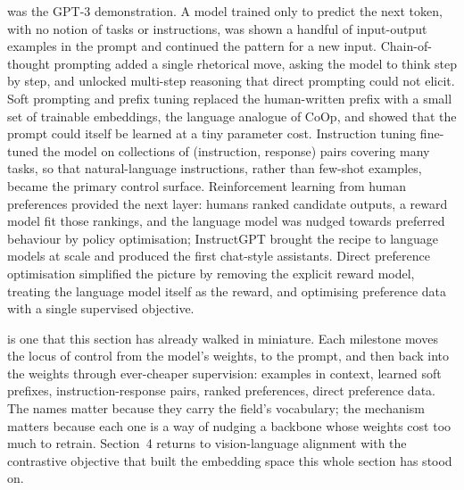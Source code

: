  was the GPT-3 demonstration\cite{Brown2020GPT3}. A model trained only to predict the next token, with no notion of tasks or instructions, was shown a handful of input-output examples in the prompt and continued the pattern for a new input. Chain-of-thought prompting\cite{Wei2022CoT} added a single rhetorical move, asking the model to think step by step, and unlocked multi-step reasoning that direct prompting could not elicit. Soft prompting and prefix tuning\cite{Lester2021PromptTuning,Li2021PrefixTuning} replaced the human-written prefix with a small set of trainable embeddings, the language analogue of CoOp, and showed that the prompt could itself be learned at a tiny parameter cost. Instruction tuning\cite{Wei2021FLAN,Sanh2021T0} fine-tuned the model on collections of (instruction, response) pairs covering many tasks, so that natural-language instructions, rather than few-shot examples, became the primary control surface. Reinforcement learning from human preferences\cite{Christiano2017Preferences} provided the next layer: humans ranked candidate outputs, a reward model fit those rankings, and the language model was nudged towards preferred behaviour by policy optimisation; InstructGPT\cite{Ouyang2022InstructGPT} brought the recipe to language models at scale and produced the first chat-style assistants. Direct preference optimisation\cite{Rafailov2023DPO} simplified the picture by removing the explicit reward model, treating the language model itself as the reward, and optimising preference data with a single supervised objective.

 is one that this section has already walked in miniature. Each milestone moves the locus of control from the model's weights, to the prompt, and then back into the weights through ever-cheaper supervision: examples in context, learned soft prefixes, instruction-response pairs, ranked preferences, direct preference data. The names matter because they carry the field's vocabulary; the mechanism matters because each one is a way of nudging a backbone whose weights cost too much to retrain. Section~4 returns to vision-language alignment with the contrastive objective that built the embedding space this whole section has stood on.

\vspace{2.5em}




